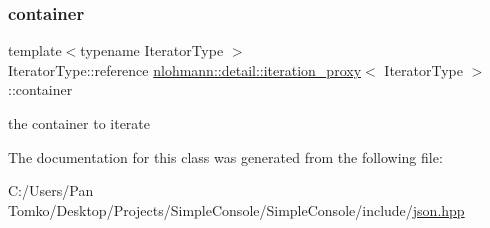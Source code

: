 \subsubsection{\texorpdfstring{container}{container}}
{\footnotesize\ttfamily template$<$typename Iterator\+Type $>$ \\
Iterator\+Type\+::reference \mbox{\hyperlink{classnlohmann_1_1detail_1_1iteration__proxy}{nlohmann\+::detail\+::iteration\+\_\+proxy}}$<$ Iterator\+Type $>$\+::container\hspace{0.3cm}{\ttfamily [private]}}



the container to iterate 



The documentation for this class was generated from the following file\+:\begin{DoxyCompactItemize}
\item 
C\+:/\+Users/\+Pan Tomko/\+Desktop/\+Projects/\+Simple\+Console/\+Simple\+Console/include/\mbox{\hyperlink{json_8hpp}{json.\+hpp}}\end{DoxyCompactItemize}
